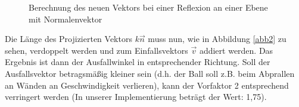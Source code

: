     \begin{figure}
	\begin{center}
    \hspace{1.5cm}%
    \caption{Berechnung des neuen Vektors bei einer Reflexion an einer Ebene mit Normalenvektor}
        \label{fig_reflexion}
	\end{center}
    \end{figure}
    
Die Länge des Projizierten Vektors $k\vec{n}$ muss nun, wie in Abbildung \ref{abb2} zu sehen, verdoppelt werden und zum Einfallsvektors $\vec{v}$ addiert werden. Das Ergebnis ist dann der Ausfallwinkel in entsprechender Richtung. Soll der Ausfallsvektor betragsmäßig kleiner sein (d.h. der Ball soll z.B. beim Abprallen an Wänden an Geschwindigkeit verlieren), kann der Vorfaktor 2 entsprechend verringert werden (In unserer Implementierung beträgt der Wert: 1,75).